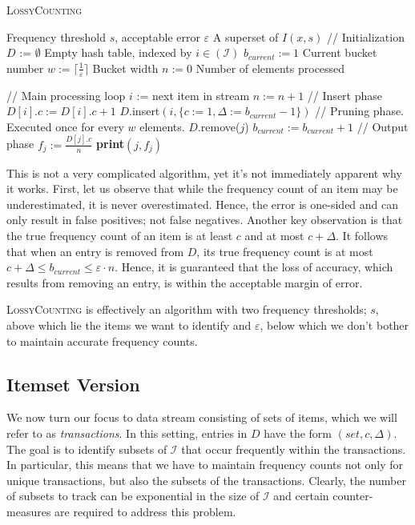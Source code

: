 \documentclass[landscape,twocolumn,a4paper]{article}
\begin{document}
\begin{algorithm}
\caption{\textsc{LossyCounting}}
\label{LossyCountingAlg}
\begin{algorithmic}
\Require Frequency threshold $s$, acceptable error $\varepsilon$
\Ensure A superset of $I(x, s)$
\State // Initialization
\State $D$ := $\emptyset$	\Comment Empty hash table, indexed by $i \in \mathcal{(I)}$
\State $b_{current} := 1$	\Comment Current bucket number
\State $w := \lceil\frac{1}{\varepsilon} \rceil$ \Comment Bucket width
\State $n := 0$				\Comment Number of elements processed

\State // Main processing loop
	\State $i$ := next item in stream
	\State $n := n + 1$
	\State // Insert phase
		\State $D[i].c := D[i].c + 1$
	\Else
		\State $D.$insert$(i, \{c := 1, \Delta := b_{current} - 1 \})$
	\EndIf
	\State // Pruning phase. Executed once for every $w$ elements.
				\State $D.$remove($j$)
			\EndIf
		\EndFor
		\State $b_{current} := b_{current} + 1$
	\EndIf
\EndWhile
\State // Output phase
		\State $f_j := \frac{D[j].c}{n}$ 
		\State \textbf{print}$(j, f_j)$
	\EndIf
\EndFor
\end{algorithmic}
\end{algorithm}

This is not a very complicated algorithm, yet it's not immediately apparent why it works. First, let us observe that while the frequency count of an item may be underestimated, it is never overestimated. Hence, the error is one-sided and can only result in false positives; not false negatives. Another key observation is that the true frequency count of an item is at least $c$ and at most $c + \Delta$. It follows that when an entry is removed from $D$, its true frequency count is at most $c + \Delta \leq b_{current} \leq \varepsilon \cdot n$. Hence, it is guaranteed that the loss of accuracy, which results from removing an entry, is within the acceptable margin of error.

\textsc{LossyCounting} is effectively an algorithm with two frequency thresholds; $s$, above which lie the items we want to identify and $\varepsilon$, below which we don't bother to maintain accurate frequency counts.

\subsection{Itemset Version}
We now turn our focus to data stream consisting of sets of items, which we will refer to as \textit{transactions}. In this setting, entries in $D$ have the form $(set, c, \Delta)$. The goal is to identify subsets of $\mathcal{I}$ that occur frequently within the transactions. In particular, this means that we have to maintain frequency counts not only for unique transactions, but also the subsets of the transactions. Clearly, the number of subsets to track can be exponential in the size of $\mathcal{I}$ and certain counter-measures are required to address this problem.
\end{document}
